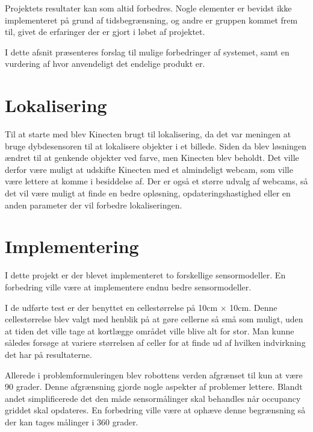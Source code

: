Projektets resultater kan som altid forbedres.
Nogle elementer er bevidst ikke implementeret på grund af tidsbegrænsning, og andre er gruppen kommet frem til, givet de erfaringer der er gjort i løbet af projektet.

I dette afsnit præsenteres forslag til mulige forbedringer af systemet, samt en vurdering af hvor anvendeligt det endelige produkt er.

\section{Lokalisering}
Til at starte med blev Kinecten brugt til lokalisering, da det var meningen at bruge dybdesensoren til at lokalisere objekter i et billede.
Siden da blev løsningen ændret til at genkende objekter ved farve, men Kinecten blev beholdt.
Det ville derfor være muligt at udskifte Kinecten med et almindeligt webcam, som ville være lettere at komme i besiddelse af. 
Der er også et større udvalg af webcams, så det vil være muligt at finde en bedre opløsning, opdateringshastighed eller en anden parameter der vil forbedre lokaliseringen.

\section{Implementering}
I dette projekt er der blevet implementeret to forskellige sensormodeller. 
En forbedring ville være at implementere endnu bedre sensormodeller.

I de udførte test er der benyttet en cellestørrelse på 10cm $ \times $ 10cm.
Denne cellestørrelse blev valgt med henblik på at gøre cellerne så små som muligt, uden at tiden det ville tage at kortlægge området ville blive alt for stor.
Man kunne således forsøge at variere størrelsen af celler for at finde ud af hvilken indvirkning det har på resultaterne.

Allerede i problemformuleringen blev robottens verden afgrænset til kun at være 90 grader. 
Denne afgrænsning gjorde nogle aspekter af problemer lettere. 
Blandt andet simplificerede det den måde sensormålinger skal behandles når occupancy griddet skal opdateres.
En forbedring ville være at ophæve denne begrænsning så der kan tages målinger i 360 grader.

